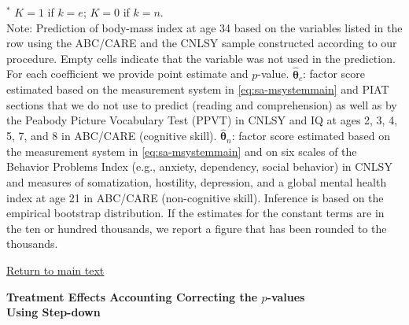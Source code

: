 \documentclass[static]{JJH-Beamer}
\begin{document}
\begin{frame}
\begin{table}[H]
\begin{center}
\end{center}
\tiny \flushleft
$^\ast$ $K=1$ if $k=e$; $K=0$ if $k=n$.\\
Note: Prediction of body-mass index at age 34 based on the variables listed in the row using the ABC/CARE and the CNLSY sample constructed according to our procedure. Empty cells indicate that the variable was not used in the prediction. For each coefficient we provide point estimate and $p$-value. $\hat{\bm{\theta}}_{c}$: factor score estimated based on the measurement system in \eqref{eq:sa-msystemmain} and PIAT sections that we do not use to predict (reading and comprehension) as well as by the Peabody Picture Vocabulary Test (PPVT) in CNLSY and IQ at ages 2, 3, 4, 5, 7, and 8 in ABC/CARE (cognitive skill). $\hat{\bm{\theta}}_{n}$: factor score estimated based on the measurement system in \eqref{eq:sa-msystemmain} and on six scales of the Behavior Problems Index (e.g., anxiety, dependency, social behavior) in CNLSY and measures of somatization, hostility, depression, and a global mental health index at age 21 in ABC/CARE (non-cognitive skill). Inference is based on the empirical bootstrap distribution. If the estimates for the constant terms are in the ten or hundred thousands, we report a figure that has been rounded to the thousands.\\
\end{table}

\end{frame}

\begin{frame}

\begin{center}
\hyperlink{ret:creamcheese}{\underline{Return to main text}}
\end{center}

\end{frame}

{}
\begin{frame}

\hypertarget{frosting}{}
\begin{center}
\textbf{Treatment Effects Accounting Correcting the $p$-values\\ Using Step-down}
\end{center}

\end{frame}
\end{document}
